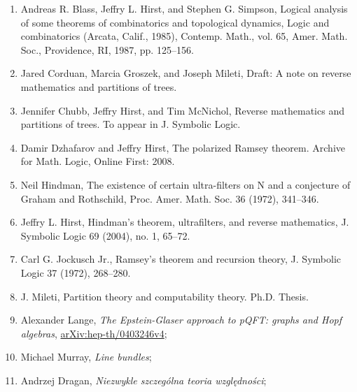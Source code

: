 \documentclass[a4paper,11pt]{article}
\begin{document}
\begin{enumerate}
\item Andreas R. Blass, Jeffry L. Hirst, and Stephen G. Simpson,
  Logical analysis of some theorems of combinatorics and topological
  dynamics, Logic and combinatorics (Arcata, Calif., 1985), Contemp.
  Math., vol. 65, Amer. Math. Soc., Providence, RI, 1987, pp. 125–156.



\item Jared Corduan, Marcia Groszek, and Joseph Mileti, Draft: A note
  on reverse mathematics and partitions of trees.



\item Jennifer Chubb, Jeffry Hirst, and Tim McNichol, Reverse
  mathematics and partitions of trees. To appear in J. Symbolic Logic.



\item Damir Dzhafarov and Jeffry Hirst, The polarized Ramsey theorem.
  Archive for Math. Logic, Online First: 2008.



\item Neil Hindman, The existence of certain ultra-filters on N and a
  conjecture of Graham and Rothschild, Proc. Amer. Math. Soc. 36
  (1972), 341–346.



\item Jeffry L. Hirst, Hindman’s theorem, ultrafilters, and reverse
  mathematics, J. Symbolic Logic 69 (2004), no. 1, 65–72.



\item Carl G. Jockusch Jr., Ramsey’s theorem and recursion theory, J.
  Symbolic Logic 37 (1972), 268–280.



\item J. Mileti, Partition theory and computability theory. Ph.D.
  Thesis.



\item Alexander Lange, \textit{The Epstein-Glaser approach to pQFT:
    graphs and Hopf algebras},
  \href{https://arxiv.org/abs/hep-th/0403246v4}{arXiv:hep-th/0403246v4};



\item Michael Murray, \textit{Line bundles};



\item Andrzej Dragan, \textit{Niezwykle szczególna teoria
    względności};




\end{enumerate}
\end{document}
